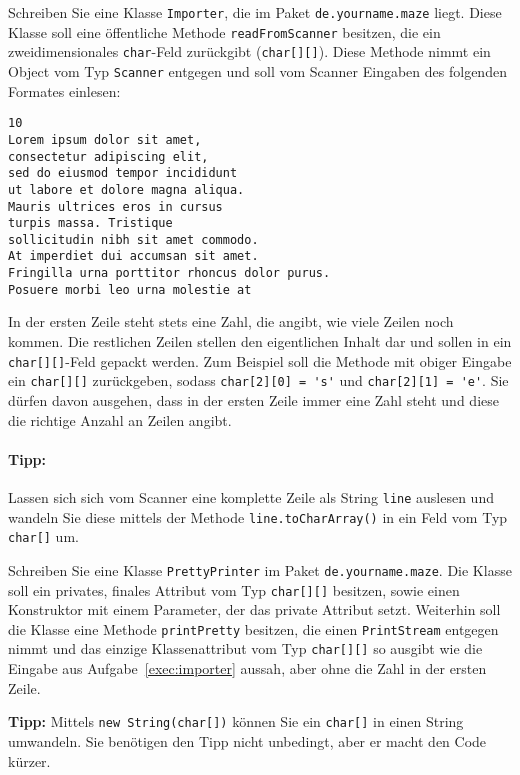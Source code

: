 \documentclass{exam}
\begin{document}
\begin{questions}
\label{exec:importer}
Schreiben Sie eine Klasse \verb|Importer|, die im Paket \verb|de.yourname.maze| liegt. Diese Klasse soll eine öffentliche Methode \verb|readFromScanner| besitzen, die ein zweidimensionales \verb|char|-Feld zurückgibt (\verb|char[][]|). Diese Methode nimmt ein Object vom Typ \verb|Scanner| entgegen und soll vom Scanner Eingaben des folgenden Formates einlesen:

\begin{lstlisting}
10
Lorem ipsum dolor sit amet,
consectetur adipiscing elit,
sed do eiusmod tempor incididunt
ut labore et dolore magna aliqua.
Mauris ultrices eros in cursus
turpis massa. Tristique
sollicitudin nibh sit amet commodo.
At imperdiet dui accumsan sit amet.
Fringilla urna porttitor rhoncus dolor purus.
Posuere morbi leo urna molestie at
\end{lstlisting}

In der ersten Zeile steht stets eine Zahl, die angibt, wie viele Zeilen noch kommen. Die restlichen Zeilen stellen den eigentlichen Inhalt dar und sollen in ein \verb|char[][]|-Feld gepackt werden. Zum Beispiel soll die Methode mit obiger Eingabe ein \verb|char[][]| zurückgeben, sodass \verb|char[2][0] = 's'| und \verb|char[2][1] = 'e'|. Sie dürfen davon ausgehen, dass in der ersten Zeile immer eine Zahl steht und diese die richtige Anzahl an Zeilen angibt.

\paragraph{Tipp:} Lassen sich sich vom Scanner eine komplette Zeile als String \verb|line| auslesen und wandeln Sie diese mittels der Methode \verb|line.toCharArray()| in ein Feld vom Typ \verb|char[]| um.


Schreiben Sie eine Klasse \verb|PrettyPrinter| im Paket \verb|de.yourname.maze|. Die Klasse soll ein privates, finales Attribut vom Typ \verb|char[][]| besitzen, sowie einen Konstruktor mit einem Parameter, der das private Attribut setzt. Weiterhin soll die Klasse eine Methode \verb|printPretty| besitzen, die einen \verb|PrintStream| entgegen nimmt und das einzige Klassenattribut vom Typ \verb|char[][]| so ausgibt wie die Eingabe aus Aufgabe~\ref{exec:importer} aussah, aber ohne die Zahl in der ersten Zeile.

\textbf{Tipp:} Mittels \verb|new String(char[])| können Sie ein \verb|char[]| in einen String umwandeln. Sie benötigen den Tipp nicht unbedingt, aber er macht den Code kürzer.


\end{questions}
\end{document}
